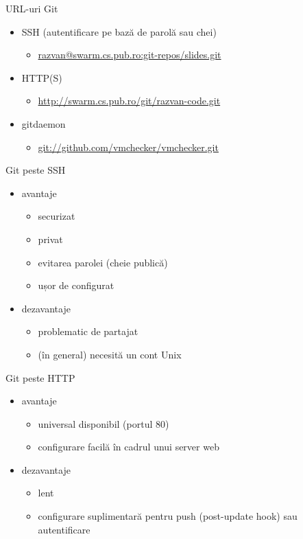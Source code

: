 \documentclass{beamer}
\begin{document}
\begin{frame}{URL-uri Git}
	\begin{itemize}
		\item SSH (autentificare pe bază de parolă sau chei)
          \begin{itemize}
            \item \url{razvan@swarm.cs.pub.ro:git-repos/slides.git}
          \end{itemize}
		\item HTTP(S)
          \begin{itemize}
            \item \url{http://swarm.cs.pub.ro/git/razvan-code.git}
          \end{itemize}
        \item gitdaemon
          \begin{itemize}
            \item \url{git://github.com/vmchecker/vmchecker.git}
          \end{itemize}
	\end{itemize}
\end{frame}

\begin{frame}{Git peste SSH}
	\begin{itemize}
		\item avantaje
          \begin{itemize}
            \item securizat
            \item privat
            \item evitarea parolei (cheie publică)
            \item ușor de configurat
          \end{itemize}
		\item dezavantaje
          \begin{itemize}
            \item problematic de partajat
            \item (în general) necesită un cont Unix
          \end{itemize}
	\end{itemize}
\end{frame}

\begin{frame}{Git peste HTTP}
	\begin{itemize}
		\item avantaje
          \begin{itemize}
            \item universal disponibil (portul 80)
            \item configurare facilă în cadrul unui server web
          \end{itemize}
		\item dezavantaje
          \begin{itemize}
            \item lent
            \item configurare suplimentară pentru push (post-update hook) sau
            autentificare
          \end{itemize}
	\end{itemize}
\end{frame}
\end{document}
